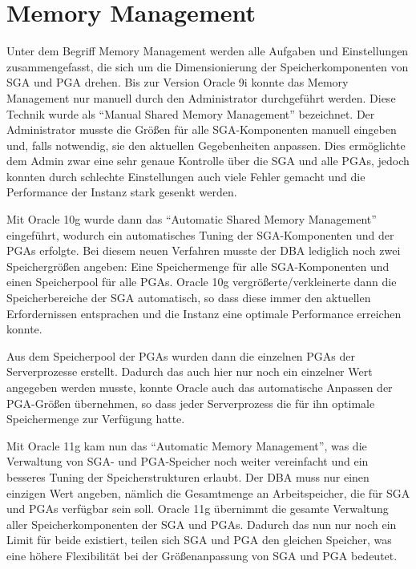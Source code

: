       \section{Memory Management}
        \label{memorymanagement}
        Unter dem Begriff Memory Management werden alle Aufgaben und Einstellungen zusammengefasst, die sich um die Dimensionierung der Speicherkomponenten von SGA und PGA drehen. Bis zur Version Oracle 9i konnte das Memory Management nur manuell durch den Administrator durchgef\"uhrt werden. Diese Technik wurde als \enquote{Manual Shared Memory Management} bezeichnet. Der Administrator musste die Gr\"o\ss{}en f\"ur alle SGA-Komponenten manuell eingeben und, falls notwendig, sie den aktuellen Gegebenheiten anpassen. Dies erm\"oglichte dem Admin zwar eine sehr genaue Kontrolle \"uber die SGA und alle PGAs, jedoch konnten durch schlechte Einstellungen auch viele Fehler gemacht und die Performance der Instanz stark gesenkt werden.

        Mit Oracle 10g wurde dann das \enquote{Automatic Shared Memory Management} eingef\"uhrt, wodurch ein automatisches Tuning der SGA-Komponenten und der PGAs erfolgte. Bei diesem neuen Verfahren musste der DBA lediglich noch zwei Speichergr\"o\ss{}en angeben: Eine Speichermenge f\"ur alle SGA-Komponenten und einen Speicherpool f\"ur alle PGAs. Oracle 10g vergr\"o\ss{}erte/verkleinerte dann die Speicherbereiche der SGA automatisch, so dass diese immer den aktuellen Erfordernissen entsprachen und die Instanz eine optimale Performance erreichen konnte.

        Aus dem Speicherpool der PGAs wurden dann die einzelnen PGAs der Serverprozesse erstellt. Dadurch das auch hier nur noch ein einzelner Wert angegeben werden musste, konnte Oracle auch das automatische Anpassen der PGA-Gr\"o\ss{}en \"ubernehmen, so dass jeder Serverprozess die f\"ur ihn optimale Speichermenge zur Verf\"ugung hatte.

        Mit Oracle 11g kam nun das \enquote{Automatic Memory Management}, was die Verwaltung von SGA- und PGA-Speicher noch weiter vereinfacht und ein besseres Tuning der Speicherstrukturen erlaubt. Der DBA muss nur einen einzigen Wert angeben, n\"amlich die Gesamtmenge an Arbeitspeicher, die f\"ur SGA und PGAs verf\"ugbar sein soll. Oracle 11g \"ubernimmt die gesamte Verwaltung aller Speicherkomponenten der SGA und PGAs. Dadurch das nun nur noch ein Limit f\"ur beide existiert, teilen sich SGA und PGA den gleichen Speicher, was eine h\"ohere Flexibilit\"at bei der Gr\"o\ss{}enanpassung von SGA und PGA bedeutet.

